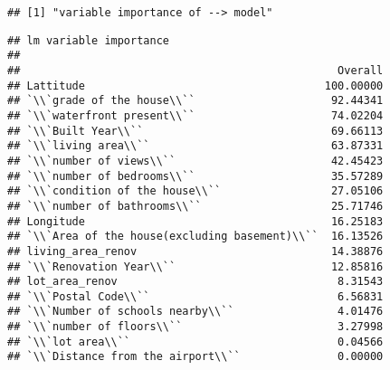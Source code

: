 \documentclass[
]{article}
\begin{document}
\begin{verbatim}
## [1] "variable importance of --> model"
\end{verbatim}

\begin{verbatim}
## lm variable importance
## 
##                                                 Overall
## Lattitude                                     100.00000
## `\\`grade of the house\\``                     92.44341
## `\\`waterfront present\\``                     74.02204
## `\\`Built Year\\``                             69.66113
## `\\`living area\\``                            63.87331
## `\\`number of views\\``                        42.45423
## `\\`number of bedrooms\\``                     35.57289
## `\\`condition of the house\\``                 27.05106
## `\\`number of bathrooms\\``                    25.71746
## Longitude                                      16.25183
## `\\`Area of the house(excluding basement)\\``  16.13526
## living_area_renov                              14.38876
## `\\`Renovation Year\\``                        12.85816
## lot_area_renov                                  8.31543
## `\\`Postal Code\\``                             6.56831
## `\\`Number of schools nearby\\``                4.01476
## `\\`number of floors\\``                        3.27998
## `\\`lot area\\``                                0.04566
## `\\`Distance from the airport\\``               0.00000
\end{verbatim}
\end{document}
